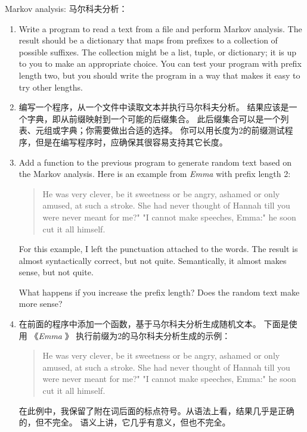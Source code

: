 \begin{exercise}
Markov analysis:
马尔科夫分析：
\begin{enumerate}
\item Write a program to read a text from a file and perform Markov
analysis.  The result should be a dictionary that maps from
prefixes to a collection of possible suffixes.  The collection
might be a list, tuple, or dictionary; it is up to you to make
an appropriate choice.  You can test your program with prefix
length two, but you should write the program in a way that makes
it easy to try other lengths.

\item 编写一个程序，从一个文件中读取文本并执行马尔科夫分析。
   结果应该是一个字典，即从前缀映射到一个可能的后缀集合。
   此后缀集合可以是一个列表、元组或字典；你需要做出合适的选择。
   你可以用长度为2的前缀测试程序，但是在编写程序时，应确保其很容易支持其它长度。

\item Add a function to the previous program to generate random text
based on the Markov analysis.  Here is an example from {\em Emma}
with prefix length 2:

\begin{quote}
He was very clever, be it sweetness or be angry, ashamed or only
amused, at such a stroke. She had never thought of Hannah till you
were never meant for me?" "I cannot make speeches, Emma:" he soon cut
it all himself.
\end{quote}

For this example, I left the punctuation attached to the words.
The result is almost syntactically correct, but not quite.
Semantically, it almost makes sense, but not quite.

What happens if you increase the prefix length?  Does the random
text make more sense?

\item 在前面的程序中添加一个函数，基于马尔科夫分析生成随机文本。
   下面是使用 《{\em Emma} 》 执行前缀为2的马尔科夫分析生成的示例：

\begin{quote}
He was very clever, be it sweetness or be angry, ashamed or only
amused, at such a stroke. She had never thought of Hannah till you
were never meant for me?" "I cannot make speeches, Emma:" he soon cut
it all himself.
\end{quote}

在此例中，我保留了附在词后面的标点符号。从语法上看，结果几乎是正确的，但不完全。
语义上讲，它几乎有意义，但也不完全。


\end{enumerate}
\end{exercise}
